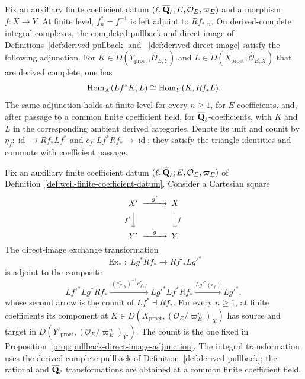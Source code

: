 \begin{proposition}
\label{prop:pullback-direct-image-adjunction}


Fix an auxiliary finite coefficient datum
\((\ell,\overline{\mathbf Q}_\ell;E,\mathcal O_E,\varpi_E)\) and a morphism \(f:X\to Y\).
At finite level, \(f_n^*=f^{-1}\) is left adjoint to \(Rf_{*,n}\).  On
derived-complete integral complexes, the completed pullback and direct image
of Definitions~\ref{def:derived-pullback} and
~\ref{def:derived-direct-image} satisfy the following adjunction.  For
\(K\in D(Y_{\mathrm{proet}},\widehat{\mathcal O}_{E,Y})\) and
\(L\in D(X_{\mathrm{proet}},\widehat{\mathcal O}_{E,X})\) that are
derived complete, one has
\[
 \operatorname{Hom}_X(Lf^*K,L)\cong\operatorname{Hom}_Y(K,Rf_*L).
\]
The same adjunction holds at finite level for every \(n\geq1\), for
\(E\)-coefficients, and, after passage to a common finite coefficient field,
for \(\overline{\mathbf Q}_\ell\)-coefficients, with \(K\) and \(L\) in the corresponding
ambient derived categories.  Denote its
unit and counit by
\(\eta_f:\operatorname{id}\to Rf_*Lf^*\) and
\(\epsilon_f:Lf^*Rf_*\to\operatorname{id}\); they satisfy the triangle
identities and commute with coefficient passage.
\end{proposition}



\begin{definition}
\label{def:direct-image-exchange}


Fix an auxiliary finite coefficient datum
\((\ell,\overline{\mathbf Q}_\ell;E,\mathcal O_E,\varpi_E)\) of
Definition~\ref{def:weil-finite-coefficient-datum}.
Consider a Cartesian square
\[
\begin{CD}
X' @>{g'}>> X\\
@V{f'}VV @VV{f}V\\
Y' @>{g}>> Y.
\end{CD}
\]
The direct-image exchange transformation
\[
 \operatorname{Ex}_*:\;Lg^*Rf_*\longrightarrow Rf'_*Lg'^*
\]
is adjoint to the composite
\[
 Lf'^*Lg^*Rf_*
 \xrightarrow{\ (c^*_{f',g})^{-1}c^*_{g',f}\ }
 Lg'^*Lf^*Rf_*
 \xrightarrow{Lg'^*(\epsilon_f)} Lg'^*,
\]
whose second arrow is the counit of \(Lf^*\dashv Rf_*\).  For every
\(n\geq1\), at finite coefficients its component at
\(K\in D(X_{\mathrm{proet}},(\mathcal O_E/\varpi_E^n)_X)\) has source and
target in
\(D(Y'_{\mathrm{proet}},(\mathcal O_E/\varpi_E^n)_{Y'})\).
The counit is the one fixed in
Proposition~\ref{prop:pullback-direct-image-adjunction}.  The integral
transformation uses the derived-complete pullback of
Definition~\ref{def:derived-pullback}; the rational and \(\overline{\mathbf Q}_\ell\)
transformations are obtained at a common finite coefficient field.
\end{definition}

